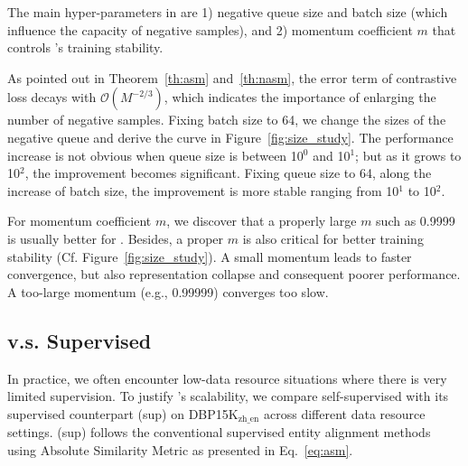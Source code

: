 



The main hyper-parameters in \solution are 1) negative queue size and batch size (which influence the capacity of negative samples), and 2) momentum coefficient $m$ that controls \solution's training stability.

As pointed out in Theorem~\ref{th:asm} and~\ref{th:nasm}, the error term of contrastive loss decays with $\mathcal{O}(M^{-2/3})$, which indicates the importance of enlarging the number of negative samples. Fixing batch size to 64, we change the sizes of the negative queue and derive the curve in Figure~\ref{fig:size_study}. The performance increase is not obvious when queue size is between 10$^0$ and 10$^1$; but as it grows to 10$^2$, the improvement becomes significant. Fixing queue size to 64, along the increase of batch size, the improvement is more stable ranging from 10$^1$ to 10$^2$. 

For momentum coefficient $m$, we discover that a properly large $m$ such as 0.9999 is usually better for \solution. Besides, a proper $m$ is also critical for better training stability (Cf. Figure~\ref{fig:size_study}). A small momentum leads to faster convergence, but also representation collapse and consequent poorer performance. A too-large momentum (e.g., 0.99999) converges too slow.


% 

\subsection{\solution v.s. Supervised \solution}
In practice, we often encounter low-data resource situations where there is very limited supervision. To justify \solution's scalability, we compare self-supervised \solution with its supervised counterpart \solution(sup) on DBP15K$_{\text{zh\_en}}$ across different data resource settings. \solution(sup) follows the conventional supervised entity alignment methods using Absolute Similarity Metric as presented in Eq.~\ref{eq:asm}.

